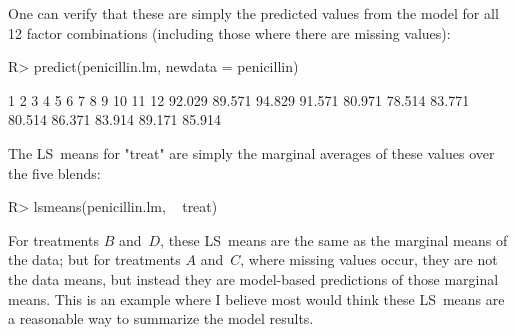 \documentclass{article}
\begin{document}
One can verify that these are simply the predicted values from the model for all 12 factor combinations (including those where there are missing values):
\begin{Winput}
R> predict(penicillin.lm, newdata = penicillin)
\end{Winput}
\begin{Woutput}
     1      2      3      4      5      6      7      8      9     10     11     12
92.029 89.571 94.829 91.571 80.971 78.514 83.771 80.514 86.371 83.914 89.171 85.914
\end{Woutput}
The LS~means for "treat" are simply the marginal averages of these values over the five blends:
\begin{Winput}
R> lsmeans(penicillin.lm, ~ treat)
\end{Winput}
For treatments $B$ and~$D$, these LS~means are the same as the marginal means of the data; but for treatments $A$ and~$C$, where missing values occur, they are not the data means, but instead they are model-based predictions of those marginal means. This is an example where I believe most would think these LS~means are a reasonable way to summarize the model results.
\end{document}
